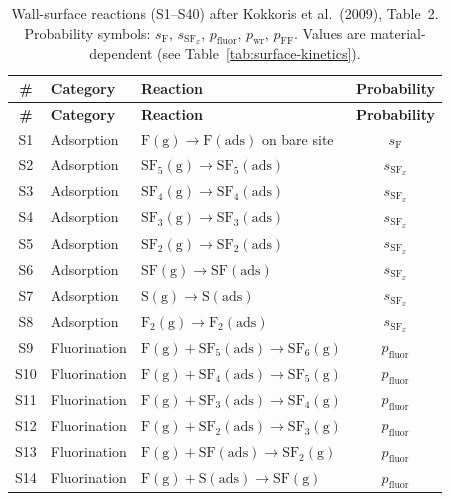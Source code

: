 \documentclass[11pt,a4paper]{report}
\newcommand{\SFsix}{\mathrm{SF}_6}
\newcommand{\SFfive}{\mathrm{SF}_5}
\newcommand{\SFfour}{\mathrm{SF}_4}
\newcommand{\SFthree}{\mathrm{SF}_3}
\begin{document}
\begin{longtable}{@{}clp{5.5cm}c@{}}
\caption{Wall-surface reactions (S1--S40) after Kokkoris et al.\ (2009), Table~2.  Probability symbols: $s_\mathrm{F}$, $s_{\mathrm{SF}_x}$, $p_\mathrm{fluor}$, $p_\mathrm{wr}$, $p_\mathrm{FF}$.  Values are material-dependent (see Table~\ref{tab:surface-kinetics}).}
\label{tab:wall-reactions} \\
\toprule
\textbf{\#} & \textbf{Category} & \textbf{Reaction} & \textbf{Probability} \\
\midrule
\endfirsthead
\toprule
\textbf{\#} & \textbf{Category} & \textbf{Reaction} & \textbf{Probability} \\
\midrule
\endhead
S1  & Adsorption & $\mathrm{F(g)} \to \mathrm{F(ads)}$ on bare site       & $s_\mathrm{F}$ \\
S2  & Adsorption & $\SFfive\mathrm{(g)} \to \SFfive\mathrm{(ads)}$        & $s_{\mathrm{SF}_x}$ \\
S3  & Adsorption & $\SFfour\mathrm{(g)} \to \SFfour\mathrm{(ads)}$        & $s_{\mathrm{SF}_x}$ \\
S4  & Adsorption & $\SFthree\mathrm{(g)} \to \SFthree\mathrm{(ads)}$      & $s_{\mathrm{SF}_x}$ \\
S5  & Adsorption & $\mathrm{SF_2(g)} \to \mathrm{SF_2(ads)}$              & $s_{\mathrm{SF}_x}$ \\
S6  & Adsorption & $\mathrm{SF(g)} \to \mathrm{SF(ads)}$                  & $s_{\mathrm{SF}_x}$ \\
S7  & Adsorption & $\mathrm{S(g)} \to \mathrm{S(ads)}$                    & $s_{\mathrm{SF}_x}$ \\
S8  & Adsorption & $\mathrm{F_2(g)} \to \mathrm{F_2(ads)}$                & $s_{\mathrm{SF}_x}$ \\
\midrule
S9  & Fluorination & $\mathrm{F(g)} + \SFfive\mathrm{(ads)} \to \SFsix\mathrm{(g)}$   & $p_\mathrm{fluor}$ \\
S10 & Fluorination & $\mathrm{F(g)} + \SFfour\mathrm{(ads)} \to \SFfive\mathrm{(g)}$   & $p_\mathrm{fluor}$ \\
S11 & Fluorination & $\mathrm{F(g)} + \SFthree\mathrm{(ads)} \to \SFfour\mathrm{(g)}$  & $p_\mathrm{fluor}$ \\
S12 & Fluorination & $\mathrm{F(g)} + \mathrm{SF_2(ads)} \to \SFthree\mathrm{(g)}$     & $p_\mathrm{fluor}$ \\
S13 & Fluorination & $\mathrm{F(g)} + \mathrm{SF(ads)} \to \mathrm{SF_2(g)}$            & $p_\mathrm{fluor}$ \\
S14 & Fluorination & $\mathrm{F(g)} + \mathrm{S(ads)} \to \mathrm{SF(g)}$               & $p_\mathrm{fluor}$ \\

\end{longtable}
\end{document}
